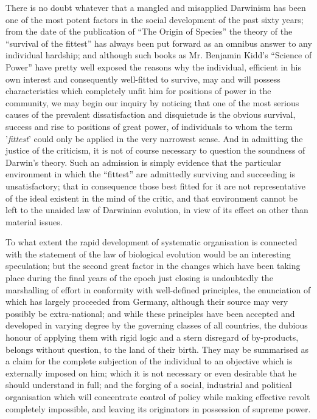 \documentclass{book}
\begin{document}
There is no doubt whatever that a mangled and misapplied Darwinism has been one of the most potent factors in the social development of the past sixty years; from the date of the publication of “The Origin of Species” the theory of the “survival of the fittest” has always been put forward as an omnibus answer to any individual hardship; and although such books as Mr. Benjamin Kidd’s “Science of Power” have pretty well exposed the reasons why the individual, efficient in his own interest and consequently well-fitted to survive, may and will possess characteristics which completely unfit him for positions of power in the community, we may begin our inquiry by noticing that one of the most serious causes of the prevalent dissatisfaction and disquietude is the obvious survival, success and rise to positions of great power, of individuals to whom the term '\emph{fittest}' could only be applied in the very narrowest sense. And in admitting the justice of the criticism, it is not of course necessary to question the soundness of Darwin’s theory. Such an admission is simply evidence that the particular environment in which the “fittest” are admittedly surviving and succeeding is unsatisfactory; that in consequence those best fitted for it are not representative of the ideal existent in the mind of the critic, and that environment cannot be left to the unaided law of Darwinian evolution, in view of its effect on other than material issues.

To what extent the rapid development of systematic organisation is connected with the statement of the law of biological evolution would be an interesting speculation; but the second great factor in the changes which have been taking place during the final years of the epoch just closing is undoubtedly the marshalling of effort in conformity with well-defined principles, the enunciation of which has largely proceeded from Germany, although their source may very possibly be extra-national; and while these principles have been accepted and developed in varying degree by the governing classes of all countries, the dubious honour of applying them with rigid logic and a stern disregard of by-products, belongs without question, to the land of their birth. They may be summarised as a claim for the complete subjection of the individual to an objective which is externally imposed on him; which it is not necessary or even desirable that he should understand in full; and the forging of a social, industrial and political organisation which will concentrate control of policy while making effective revolt completely impossible, and leaving its originators in possession of supreme power.
\end{document}
